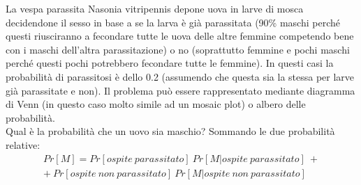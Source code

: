 \documentclass[drafts, 10pt]{book}
\newcounter{example}[section]
\begin{document}
\begin{example}
    La vespa parassita Nasonia vitripennis depone uova in larve di mosca decidendone il sesso in base a se la larva è già parassitata (90\% maschi perché questi riusciranno a fecondare tutte le uova delle altre femmine competendo bene con i maschi dell’altra parassitazione) o no (soprattutto femmine e pochi maschi perché questi pochi potrebbero fecondare tutte le femmine). In questi casi la probabilità di parassitosi è dello 0.2 (assumendo che questa sia la stessa per larve già parassitate e non). Il problema può essere rappresentato mediante diagramma di Venn (in questo caso molto simile ad un mosaic plot) o albero delle probabilità. 
    \\
    Qual è la probabilità che un uovo sia maschio? Sommando le due probabilità relative:
    \begin{equation}
        \begin{gathered}
            Pr[M]=Pr[ospite\ parassitato]\ Pr[M|ospite\ parassitato]\ + \\ +\ Pr[ospite\ non\ parassitato]\ Pr[M|ospite\ non\ parassitato]
        \end{gathered}
    \end{equation}
\end{example}
 
\end{document}
